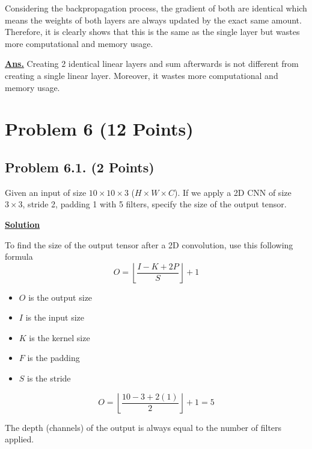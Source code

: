 \documentclass[12pt, a4paper]{article}
\begin{document}
            Considering the backpropagation process, the gradient of both are identical which means the weights of both layers are always updated by the exact same amount.
            Therefore, it is clearly shows that this is the same as the single layer but wastes more computational and memory usage.

            \vspace{1em}

            \noindent \underline{\textbf{Ans.}} Creating 2 identical linear layers and sum afterwards is not different from creating a single linear layer.
            Moreover, it wastes more computational and memory usage.

    \pagebreak

    \section{Problem 6 (12 Points)}
        \subsection{Problem 6.1. (2 Points)}
            Given an input of size $10 \times 10 \times 3$ ($H \times W \times C$).
            If we apply a 2D CNN of size $3 \times 3$, stride 2, padding 1 with 5 filters, specify the size of the output tensor.

            \vspace{1em}

            \noindent \underline{\textbf{Solution}}

            \vspace{0.25em}

            \noindent To find the size of the output tensor after a 2D convolution, use this following formula
            $$O = \left\lfloor \frac{I - K + 2P}{S} \right\rfloor + 1$$
            \begin{itemize}
                \item $O$ is the output size
                \item $I$ is the input size
                \item $K$ is the kernel size
                \item $F$ is the padding
                \item $S$ is the stride
            \end{itemize}
            $$O = \left\lfloor \frac{10 - 3 + 2(1)}{2} \right\rfloor + 1 = 5$$

            \noindent The depth (channels) of the output is always equal to the number of filters applied.
\end{document}
